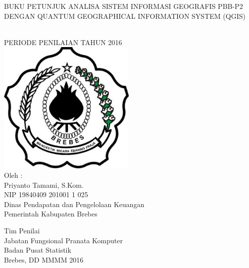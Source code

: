 \begin{titlepage}

\begin{center}
{\large BUKU PETUNJUK ANALISA SISTEM INFORMASI GEOGRAFIS PBB-P2 DENGAN QUANTUM GEOGRAPHICAL INFORMATION SYSTEM (QGIS)}

\HRule\\[1cm]

PERIODE PENILAIAN TAHUN 2016\\[1cm]

\includegraphics[width=0.5\textwidth]{./resources/logo}\\[1cm]

Oleh :\\
Priyanto Tamami, S.Kom.\\
NIP 19840409 201001 1 025\\
Dinas Pendapatan dan Pengelolaan Keuangan\\
Pemerintah Kabupaten Brebes\\[1cm]

\vfill

Tim Penilai\\
Jabatan Fungsional Pranata Komputer\\
Badan Pusat Statistik\\
Brebes, DD MMMM 2016
\end{center}

\end{titlepage}
